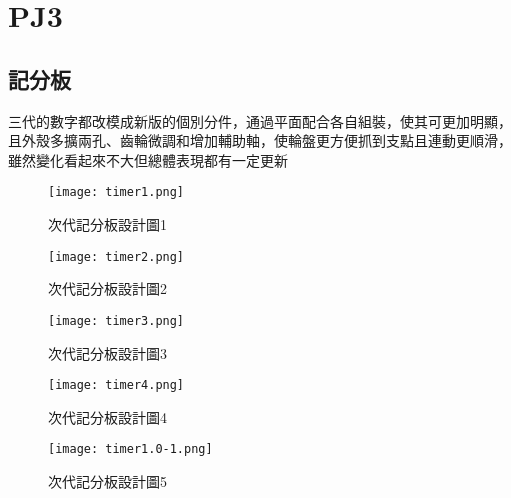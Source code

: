 \chapter{PJ3}


\section{記分板}


\begin{flushleft}

\fontsize{14pt}{20pt}\sectionef\hspace{12pt}\quad 三代的數字都改模成新版的個別分件，通過平面配合各自組裝，使其可更加明顯，且外殼多擴兩孔、齒輪微調和增加輔助軸，使輪盤更方便抓到支點且連動更順滑，雖然變化看起來不大但總體表現都有一定更新

\end{flushleft}



\begin{figure}
  
  \texttt{[image: timer1.png]}
  \caption{次代記分板設計圖1}
  \label{fig:次代記分板設計圖1}
\end{figure}



\begin{figure}
  
  \texttt{[image: timer2.png]}
  \caption{次代記分板設計圖2}
  \label{fig:次代記分板設計圖2}
\end{figure}


\begin{figure}
  
  \texttt{[image: timer3.png]}
  \caption{次代記分板設計圖3}
  \label{fig:example}
\end{figure}



\begin{figure}
  
  \texttt{[image: timer4.png]}
  \caption{次代記分板設計圖4}
  \label{fig:example}
\end{figure}



\begin{figure}
  \centering
  \texttt{[image: timer1.0-1.png]}
  \caption{次代記分板設計圖5}
  \label{fig:example}
\end{figure}







